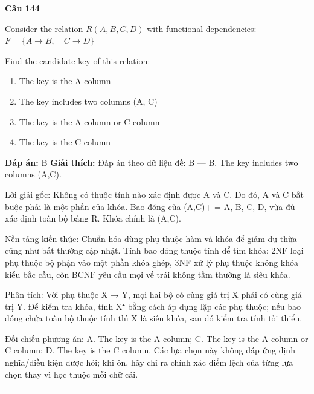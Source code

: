 \documentclass[11pt,a4paper]{article}
\newenvironment{question}[1]{%
  \par\vspace{1em}\noindent\textbf{\large Câu #1}\par\vspace{0.4em}
}{%
  \par\vspace{1em}\hrule\vspace{0.6em}
}
\newenvironment{choices}{%
  \begin{enumerate}[label=\textbf{\Alph*.},leftmargin=2.2em,itemsep=2pt,topsep=3pt]
}{%
  \end{enumerate}
}
\newcommand{\choice}{\item}
\begin{document}
\begin{question}{144}
Consider the relation \(R(A, B, C, D)\) with functional dependencies:
\(F = \{ A \rightarrow B, \quad C \rightarrow D \}\)

Find the candidate key of this relation:
\begin{choices}
\choice The key is the A column
\choice The key includes two columns (A, C)
\choice The key is the A column or C column
\choice The key is the C column
\end{choices}
\textbf{Đáp án:} B
\textbf{Giải thích:} Đáp án theo dữ liệu đề: B — B. The key includes two columns (A,C).

Lời giải gốc: Không có thuộc tính nào xác định được A và C. Do đó, A và C bắt buộc phải là một phần của khóa. Bao đóng của (A,C)+ = {A, B, C, D}, vừa đủ xác định toàn bộ bảng R. Khóa chính là (A,C).

Nền tảng kiến thức: Chuẩn hóa dùng phụ thuộc hàm và khóa để giảm dư thừa cũng như bất thường cập nhật. Tính bao đóng thuộc tính để tìm khóa; 2NF loại phụ thuộc bộ phận vào một phần khóa ghép, 3NF xử lý phụ thuộc không khóa kiểu bắc cầu, còn BCNF yêu cầu mọi vế trái không tầm thường là siêu khóa.

Phân tích: Với phụ thuộc X → Y, mọi hai bộ có cùng giá trị X phải có cùng giá trị Y. Để kiểm tra khóa, tính X⁺ bằng cách áp dụng lặp các phụ thuộc; nếu bao đóng chứa toàn bộ thuộc tính thì X là siêu khóa, sau đó kiểm tra tính tối thiểu.

Đối chiếu phương án: A. The key is the A column; C. The key is the A column or C column; D. The key is the C column. Các lựa chọn này không đáp ứng định nghĩa/điều kiện được hỏi; khi ôn, hãy chỉ ra chính xác điểm lệch của từng lựa chọn thay vì học thuộc mỗi chữ cái.
\end{question}
\end{document}
